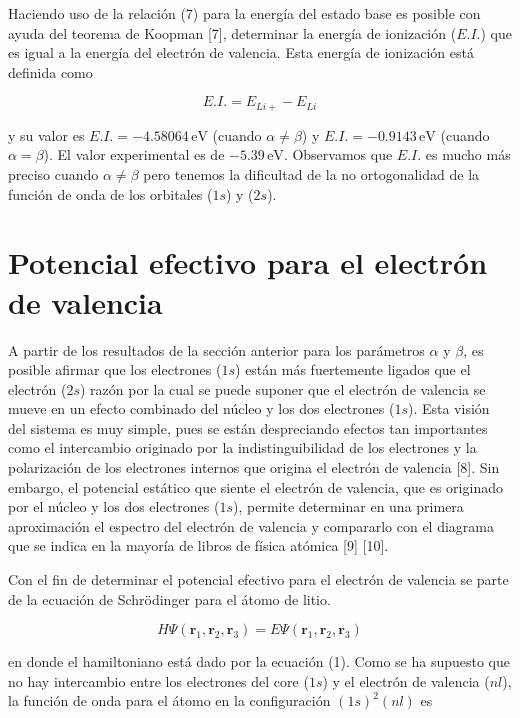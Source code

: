 \documentclass{article}
\begin{document}
Haciendo uso de la relación (7) para la energía del estado base es posible con ayuda del teorema de Koopman [7], determinar la energía de ionización (\(E.I.\)) que es igual a la energía del electrón de valencia. Esta energía de ionización está definida como

\[
E.I. = E_{Li+} - E_{Li} \tag{8}
\]

y su valor es \( E.I. = -4.58064 \, \text{eV} \) (cuando \(\alpha \neq \beta\)) y \( E.I. = -0.9143 \, \text{eV} \) (cuando \(\alpha = \beta\)). El valor experimental es de \(-5.39 \, \text{eV}\). Observamos que \( E.I. \) es mucho más preciso cuando \(\alpha \neq \beta\) pero tenemos la dificultad de la no ortogonalidad de la función de onda de los orbitales (\(1s\)) y (\(2s\)).

\section{Potencial efectivo para el electrón de valencia}

A partir de los resultados de la sección anterior para los parámetros \(\alpha\) y \(\beta\), es posible afirmar que los electrones (\(1s\)) están más fuertemente ligados que el electrón (\(2s\)) razón por la cual se puede suponer que el electrón de valencia se mueve en un efecto combinado del núcleo y los dos electrones (\(1s\)). Esta visión del sistema es muy simple, pues se están despreciando efectos tan importantes como el intercambio originado por la indistinguibilidad de los electrones y la polarización de los electrones internos que origina el electrón de valencia [8]. Sin embargo, el potencial estático que siente el electrón de valencia, que es originado por el núcleo y los dos electrones (\(1s\)), permite determinar en una primera aproximación el espectro del electrón de valencia y compararlo con el diagrama que se indica en la mayoría de libros de física atómica [9] [10].

Con el fin de determinar el potencial efectivo para el electrón de valencia se parte de la ecuación de Schrödinger para el átomo de litio.

\[
H \Psi(\mathbf{r}_1, \mathbf{r}_2, \mathbf{r}_3) = E \Psi(\mathbf{r}_1, \mathbf{r}_2, \mathbf{r}_3) \tag{9}
\]

en donde el hamiltoniano está dado por la ecuación (1). Como se ha supuesto que no hay intercambio entre los electrones del core (\(1s\)) y el electrón de valencia (\(nl\)), la función de onda para el átomo en la configuración \((1s)^2(nl)\) es
\end{document}
